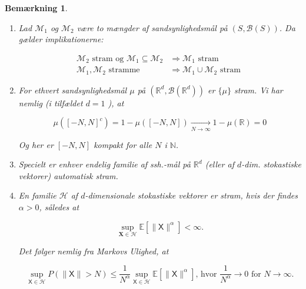 \documentclass{article}
\newcommand{\1}{\mathbbm{1}}
\newcommand{\X}{\mathsf{X}}
\theoremstyle{boxed}
\newtheorem{remark}[theorem]{Bemærkning}
\begin{document}
\begin{remark}
    \begin{enumerate}
        \item Lad $\mathcal{M}_1$ og $\mathcal{M}_2$ være to mængder af sandsynlighedsmål på $(S, \mathcal{B}(S))$. Da gælder implikationerne:

        $$
        \begin{aligned}
        \mathcal{M}_2 \text { stram og } \mathcal{M}_1 \subseteq \mathcal{M}_2 & \Longrightarrow \mathcal{M}_1 \text { stram } \\
        \mathcal{M}_1, \mathcal{M}_2 \text { stramme } & \Longrightarrow \mathcal{M}_1 \cup \mathcal{M}_2 \text { stram }
        \end{aligned}
        $$
        \item For ethvert sandsynlighedsmål $\mu$ på $\left(\mathbb{R}^d, \mathcal{B}\left(\mathbb{R}^d\right)\right)$ er $\{\mu\}$ stram. Vi har nemlig (i tilfældet $d=1$ ), at

        $$
        \mu\left([-N, N]^c\right)=1-\mu([-N, N]) \xrightarrow[N \rightarrow \infty]{ } 1-\mu(\mathbb{R})=0
        $$
        
        
        Og her er $[-N, N]$ kompakt for alle $N$ i $\mathbb{N}$.
        
        \item Specielt er enhver endelig familie af ssh.-mål på $\mathbb{R}^d$ (eller af $d$-dim. stokastiske vektorer) automatisk stram.
        \item En familie $\mathcal{H}$ af $d$-dimensionale stokastiske vektorer er stram, hvis der findes $\alpha>0$, således at

        $$
        \sup _{\mathbf{X} \in \mathcal{H}} \mathbb{E}\left[\|\X\|^\alpha\right]<\infty .
        $$
        
        
        Det følger nemlig fra Markovs Ulighed, at
        
        $$
        \sup _{\X \in \mathcal{H}} P(\|\X\|>N) \leq \frac{1}{N^\alpha} \sup _{\X \in \mathcal{H}} \mathbb{E}\left[\|\X\|^\alpha\right] \text {, hvor } \frac{1}{N^\alpha} \rightarrow 0 \text { for } N \rightarrow \infty .
        $$
              
    \end{enumerate}
\end{remark}
\end{document}
